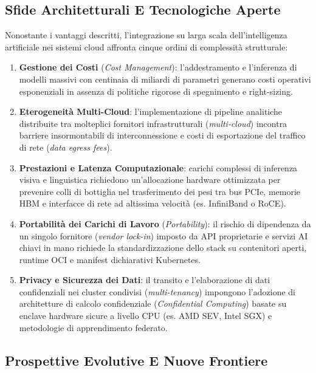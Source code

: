 \documentclass[11pt, a4paper]{article}
\begin{document}
\subsection{Sfide Architetturali E Tecnologiche Aperte}

Nonostante i vantaggi descritti, l'integrazione su larga scala dell'intelligenza artificiale nei sistemi cloud affronta cinque ordini di complessità strutturale:
\begin{enumerate}
    \item \textbf{Gestione dei Costi} (\emph{Cost Management}): l'addestramento e l'inferenza di modelli massivi con centinaia di miliardi di parametri generano costi operativi esponenziali in assenza di politiche rigorose di spegnimento e right-sizing.
    \item \textbf{Eterogeneità Multi-Cloud}: l'implementazione di pipeline analitiche distribuite tra molteplici fornitori infrastrutturali (\emph{multi-cloud}) incontra barriere insormontabili di interconnessione e costi di esportazione del traffico di rete (\emph{data egress fees}).
    \item \textbf{Prestazioni e Latenza Computazionale}: carichi complessi di inferenza visiva e linguistica richiedono un'allocazione hardware ottimizzata per prevenire colli di bottiglia nel trasferimento dei pesi tra bus PCIe, memorie HBM e interfacce di rete ad altissima velocità (es. InfiniBand o RoCE).
    \item \textbf{Portabilità dei Carichi di Lavoro} (\emph{Portability}): il rischio di dipendenza da un singolo fornitore (\emph{vendor lock-in}) imposto da API proprietarie e servizi AI chiavi in mano richiede la standardizzazione dello stack su contenitori aperti, runtime OCI e manifest dichiarativi Kubernetes.
    \item \textbf{Privacy e Sicurezza dei Dati}: il transito e l'elaborazione di dati confidenziali nei cluster condivisi (\emph{multi-tenancy}) impongono l'adozione di architetture di calcolo confidenziale (\emph{Confidential Computing}) basate su enclave hardware sicure a livello CPU (es. AMD SEV, Intel SGX) e metodologie di apprendimento federato.
\end{enumerate}


\subsection{Prospettive Evolutive E Nuove Frontiere}
\end{document}
